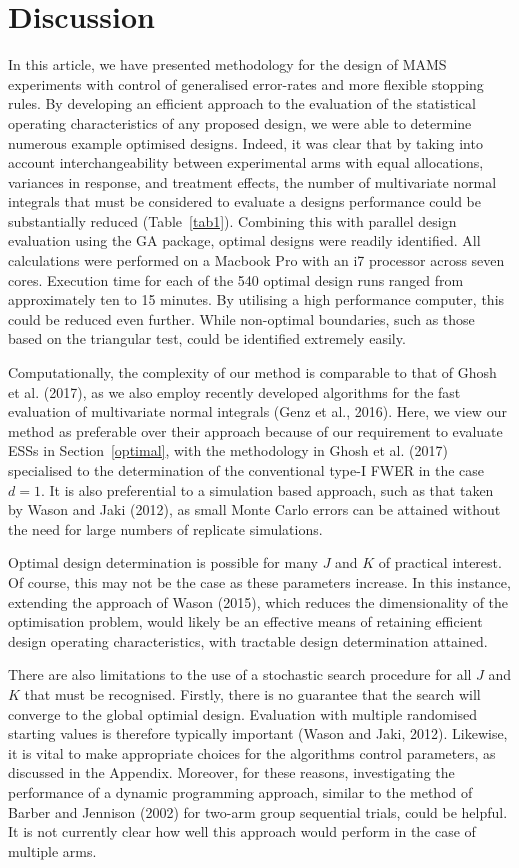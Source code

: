 \documentclass{article}
\numberwithin{equation}{section}
\theoremstyle{plain}
\begin{document}
\section{Discussion}\label{disc}

In this article, we have presented methodology for the design of MAMS experiments with control of generalised error-rates and more flexible stopping rules. By developing an efficient approach to the evaluation of the statistical operating characteristics of any proposed design, we were able to determine numerous example optimised designs. Indeed, it was clear that by taking into account interchangeability between experimental arms with equal allocations, variances in response, and treatment effects, the number of multivariate normal integrals that must be considered to evaluate a designs performance could be substantially reduced (Table~\ref{tab1}). Combining this with parallel design evaluation using the GA package, optimal designs were readily identified. All calculations were performed on a Macbook Pro with an i7 processor across seven cores. Execution time for each of the 540 optimal design runs ranged from approximately ten to 15 minutes. By utilising a high performance computer, this could be reduced even further. While non-optimal boundaries, such as those based on the triangular test, could be identified extremely easily.

Computationally, the complexity of our method is comparable to that of Ghosh et al. (2017), as we also employ recently developed algorithms for the fast evaluation of multivariate normal integrals (Genz et al., 2016). Here, we view our method as preferable over their approach because of our requirement to evaluate ESSs in Section~\ref{optimal}, with the methodology in Ghosh et al. (2017) specialised to the determination of the conventional type-I FWER in the case $d=1$. It is also preferential to a simulation based approach, such as that taken by Wason and Jaki (2012), as small Monte Carlo errors can be attained without the need for large numbers of replicate simulations.

Optimal design determination is possible for many $J$ and $K$ of practical interest. Of course, this may not be the case as these parameters increase. In this instance, extending the approach of Wason (2015), which reduces the dimensionality of the optimisation problem, would likely be an effective means of retaining efficient design operating characteristics, with tractable design determination attained.

There are also limitations to the use of a stochastic search procedure for all $J$ and $K$ that must be recognised. Firstly, there is no guarantee that the search will converge to the global optimial design. Evaluation with multiple randomised starting values is therefore typically important (Wason and Jaki, 2012). Likewise, it is vital to make appropriate choices for the algorithms control parameters, as discussed in the Appendix. Moreover, for these reasons, investigating the performance of a dynamic programming approach, similar to the method of Barber and Jennison (2002) for two-arm group sequential trials, could be helpful. It is not currently clear how well this approach would perform in the case of multiple arms.
\end{document}
